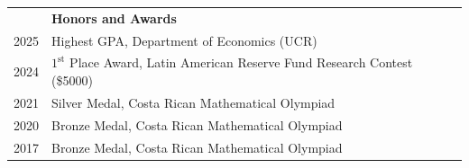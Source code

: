 \documentclass[letterpaper, 11pt]{article}
\newcommand{\headingfont}{\bfseries\Large\color{ChadDarkBlue}}
\newenvironment{SectionTableSingleSpace}[1]{
	\renewcommand*{\arraystretch}{1.2}
	\setlength{\tabcolsep}{10pt}
	\begin{longtable}{Rp{5.2in}} & #1 \\[0.6em]}
{\end{longtable}\vspace{-1cm}}
\begin{document}

\begin{SectionTableSingleSpace}{\headingfont Honors and Awards}
2025 & Highest GPA, Department of Economics (UCR) \\

2024 & $1^{\text{st}}$ Place Award, Latin American Reserve Fund Research Contest (\$5000) \\

2021 &
Silver Medal, Costa Rican Mathematical Olympiad \\

2020 &
Bronze Medal, Costa Rican Mathematical Olympiad \\

2017 &
Bronze Medal, Costa Rican Mathematical Olympiad \\

\end{SectionTableSingleSpace}
\end{document}
